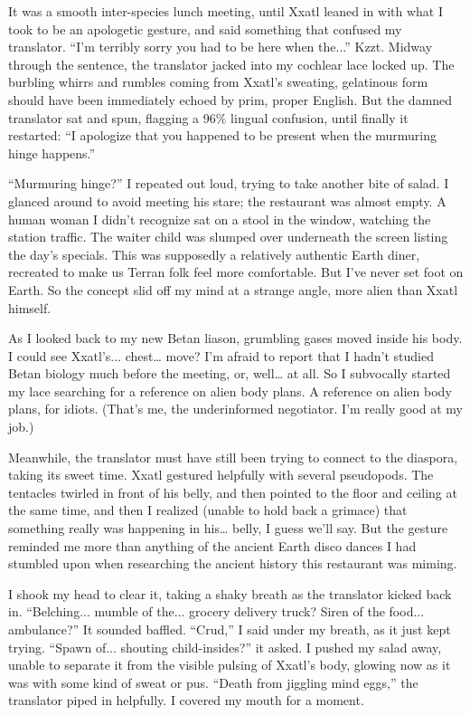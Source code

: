 
It was a smooth inter-species lunch meeting, until Xxatl leaned in with
what I took to be an apologetic gesture, and said something that
confused my translator. ``I'm terribly sorry you had to be here when
the...'' Kzzt. Midway through the sentence, the translator jacked into
my cochlear lace locked up. The burbling whirrs and rumbles coming from
Xxatl's sweating, gelatinous form should have been immediately echoed by
prim, proper English. But the damned translator sat and spun, flagging a
96\% lingual confusion, until finally it restarted: ``I apologize that
you happened to be present when the murmuring hinge happens.''

``Murmuring hinge?'' I repeated out loud, trying to take another bite of
salad. I glanced around to avoid meeting his stare; the restaurant was
almost empty. A human woman I didn't recognize sat on a stool in the
window, watching the station traffic. The waiter child was slumped over
underneath the screen listing the day's specials. This was supposedly a
relatively authentic Earth diner, recreated to make us Terran folk feel
more comfortable. But I've never set foot on Earth. So the concept slid
off my mind at a strange angle, more alien than Xxatl himself.

As I looked back to my new Betan liason, grumbling gases moved inside
his body. I could see Xxatl's... chest\ldots{} move? I'm afraid to
report that I hadn't studied Betan biology much before the meeting, or,
well\ldots{} at all. So I subvocally started my lace searching for a
reference on alien body plans. A reference on alien body plans, for
idiots. (That's me, the underinformed negotiator. I'm really good at my
job.)

Meanwhile, the translator must have still been trying to connect to the
diaspora, taking its sweet time. Xxatl gestured helpfully with several
pseudopods. The tentacles twirled in front of his belly, and then
pointed to the floor and ceiling at the same time, and then I realized
(unable to hold back a grimace) that something really was happening in
his\ldots{} belly, I guess we'll say. But the gesture reminded me more
than anything of the ancient Earth disco dances I had stumbled upon when
researching the ancient history this restaurant was miming.

I shook my head to clear it, taking a shaky breath as the translator
kicked back in. ``Belching... mumble of the... grocery delivery truck?
Siren of the food... ambulance?'' It sounded baffled. ``Crud,'' I said
under my breath, as it just kept trying. ``Spawn of... shouting
child-insides?'' it asked. I pushed my salad away, unable to separate it
from the visible pulsing of Xxatl's body, glowing now as it was with
some kind of sweat or pus. ``Death from jiggling mind eggs,'' the
translator piped in helpfully. I covered my mouth for a moment.

